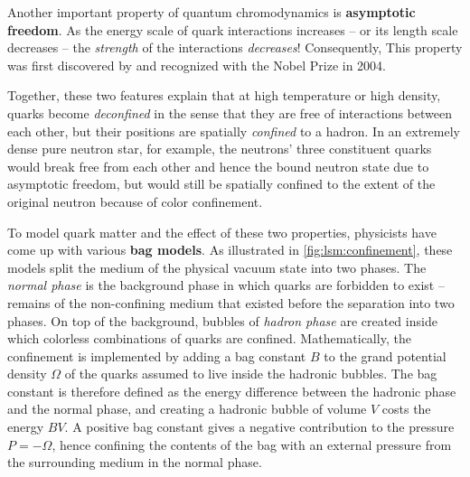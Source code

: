 Another important property of quantum chromodynamics is \textbf{asymptotic freedom}.
As the energy scale of quark interactions increases -- or its length scale decreases -- the \emph{strength} of the interactions \emph{decreases}!
Consequently, 
This property was first discovered by \cite{ref:asymptotic_freedom_gross_wilczek,ref:asymptotic_freedom_politzer} and recognized with the Nobel Prize in 2004.

Together, these two features explain that at high temperature or high density,
quarks become \emph{deconfined} in the sense that they are free of interactions between each other,
but their positions are spatially \emph{confined} to a hadron.
In an extremely dense pure neutron star, for example,
the neutrons' three constituent quarks would break free from each other and hence the bound neutron state due to asymptotic freedom,
but would still be spatially confined to the extent of the original neutron because of color confinement.

To model quark matter and the effect of these two properties,
physicists have come up with various \textbf{bag models}.
As illustrated in \cref{fig:lsm:confinement}, these models split the medium of the physical vacuum state into two phases.
The \emph{normal phase} is the background phase in which quarks are forbidden to exist -- remains of the non-confining medium that existed before the separation into two phases.
On top of the background, bubbles of \emph{hadron phase} are created inside which colorless combinations of quarks are confined.
Mathematically, the confinement is implemented by adding a bag constant $B$ to the grand potential density $\Omega$ of the quarks assumed to live inside the hadronic bubbles.
The bag constant is therefore defined as the energy difference between the hadronic phase and the normal phase,
and creating a hadronic bubble of volume $V$ costs the energy $B V$.
A positive bag constant gives a negative contribution to the pressure $P = -\Omega$,
hence confining the contents of the bag with an external pressure from the surrounding medium in the normal phase.

